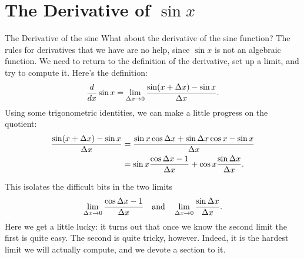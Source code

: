 \section{The Derivative of $\sin x$}{}{The Derivative of the sine}
\nobreak
What about the derivative of the sine function? The rules for
derivatives that we have are no help, since $\sin x$ is not an
algebraic function. We need to return to the definition of the
derivative, set up a limit, and try to compute it. Here's the
definition:
$${d\over dx}\sin x = \lim_{\Delta x\to0} {\sin(x+\Delta x)-\sin x
  \over \Delta x}.$$
Using some trigonometric identities, we can make a little progress on
  the quotient:
\begin{align*}
{\sin(x+\Delta x)-\sin x
  \over \Delta x}&={\sin x \cos \Delta x + \sin \Delta x \cos x - \sin
  x\over \Delta x} \\
&=\sin x{\cos \Delta x - 1\over \Delta x}+\cos x{\sin\Delta x\over
  \Delta x}. \\
\end{align*}

\noindent
This isolates the difficult bits in the two limits
$$\lim_{\Delta x\to0}{\cos \Delta x - 1\over \Delta x}\quad\hbox{and}\quad
 \lim_{\Delta x\to0} {\sin\Delta x\over \Delta x}.$$
Here we get a little lucky: it turns out that once we know the second
 limit the first is quite easy. The second is quite tricky,
 however. Indeed, it is the hardest limit we will actually compute,
 and we devote a section to it.
